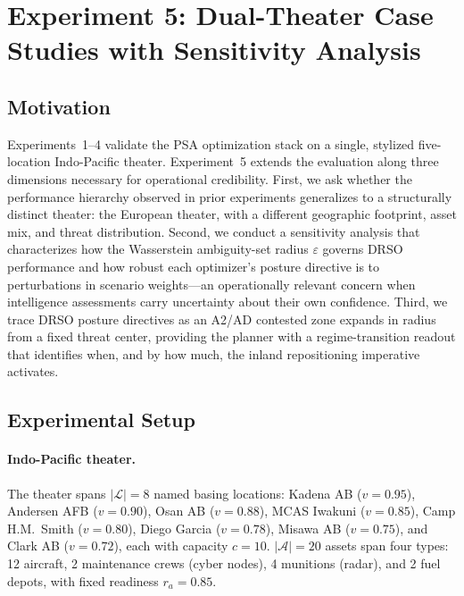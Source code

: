 \documentclass[11pt]{article}
\begin{document}
\section{Experiment 5: Dual-Theater Case Studies with Sensitivity Analysis}
\label{sec:exp5}

\subsection{Motivation}

Experiments~1--4 validate the PSA optimization stack on a single,
stylized five-location Indo-Pacific theater.
Experiment~5 extends the evaluation along three dimensions necessary
for operational credibility.
First, we ask whether the performance hierarchy observed in prior
experiments generalizes to a structurally distinct theater: the
European theater, with a different geographic footprint, asset mix,
and threat distribution.
Second, we conduct a sensitivity analysis that characterizes how the
Wasserstein ambiguity-set radius $\varepsilon$ governs DRSO performance
and how robust each optimizer's posture directive is to perturbations
in scenario weights---an operationally relevant concern when
intelligence assessments carry uncertainty about their own confidence.
Third, we trace DRSO posture directives as an A2/AD contested zone
expands in radius from a fixed threat center, providing the planner
with a regime-transition readout that identifies when, and by how
much, the inland repositioning imperative activates.

\subsection{Experimental Setup}
\label{sec:exp5:setup}

\paragraph{Indo-Pacific theater.}
The theater spans $|\mathcal{L}| = 8$ named basing locations:
Kadena AB ($v = 0.95$), Andersen AFB ($v = 0.90$), Osan AB
($v = 0.88$), MCAS Iwakuni ($v = 0.85$), Camp H.M.\ Smith
($v = 0.80$), Diego Garcia ($v = 0.78$), Misawa AB ($v = 0.75$),
and Clark AB ($v = 0.72$), each with capacity $c = 10$.
$|\mathcal{A}| = 20$ assets span four types: 12 aircraft,
2 maintenance crews (cyber nodes), 4 munitions (radar), and
2 fuel depots, with fixed readiness $r_a = 0.85$.
\end{document}
